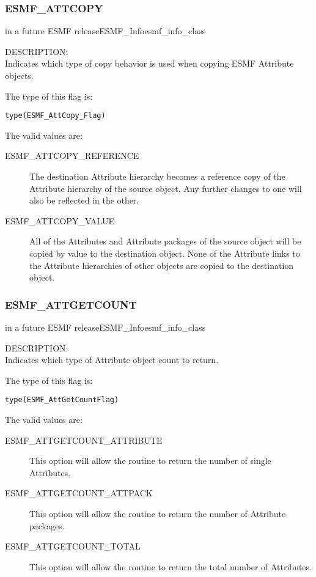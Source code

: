 
\subsubsection{ESMF\_ATTCOPY}
\label{const:attcopy}
{in a future ESMF release}{ESMF\_Info}{esmf_info_class}

{\sf DESCRIPTION:\\}
Indicates which type of copy behavior is used when copying ESMF Attribute objects.

The type of this flag is:

{\tt type(ESMF\_AttCopy\_Flag)}

The valid values are:
\begin{description}
  \item[ESMF\_ATTCOPY\_REFERENCE]
    The destination Attribute hierarchy becomes a reference copy of
    the Attribute hierarchy of the source object. Any further changes to one
    will also be reflected in the other.
  \item[ESMF\_ATTCOPY\_VALUE]
    All of the Attributes and Attribute packages of the source object will be
    copied by value to the destination object. None of the Attribute links to
    the Attribute hierarchies of other objects are copied to the
    destination object.
\end{description}

\subsubsection{ESMF\_ATTGETCOUNT}
\label{const:attgetcount}
{in a future ESMF release}{ESMF\_Info}{esmf_info_class}

{\sf DESCRIPTION:\\}
Indicates which type of Attribute object count to return.

The type of this flag is:

{\tt type(ESMF\_AttGetCountFlag)}

The valid values are:
\begin{description}
	\item[ESMF\_ATTGETCOUNT\_ATTRIBUTE]
	This option will allow the routine to return the number of single Attributes.
	\item[ESMF\_ATTGETCOUNT\_ATTPACK]
	This option will allow the routine to return the number of Attribute packages.
	\item[ESMF\_ATTGETCOUNT\_TOTAL]
	This option will allow the routine to return the total number of Attributes.
\end{description}

